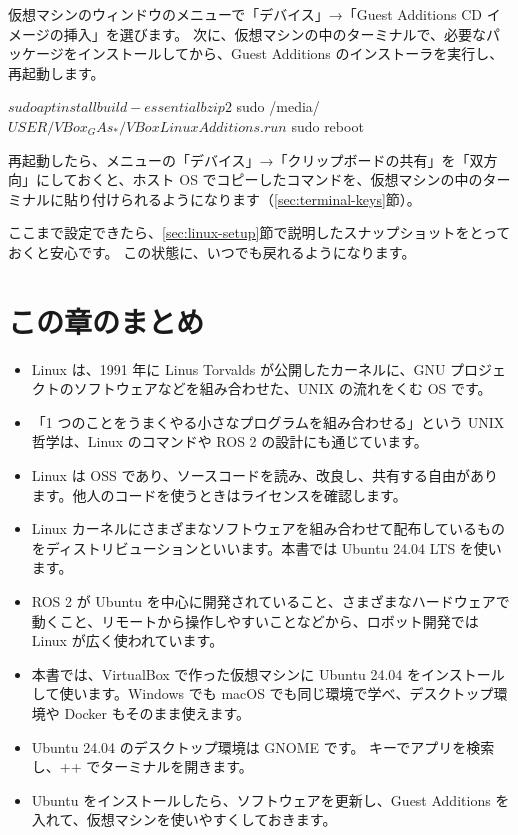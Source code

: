 仮想マシンのウィンドウのメニューで「デバイス」→「Guest Additions CD イメージの挿入」を選びます。
次に、仮想マシンの中のターミナルで、必要なパッケージをインストールしてから、Guest Additions のインストーラを実行し、再起動します。

\begin{terminal}
$ sudo apt install build-essential bzip2
$ sudo /media/$USER/VBox_GAs_*/VBoxLinuxAdditions.run
$ sudo reboot
\end{terminal}

再起動したら、メニューの「デバイス」→「クリップボードの共有」を「双方向」にしておくと、ホスト OS でコピーしたコマンドを、仮想マシンの中のターミナルに貼り付けられるようになります（\ref{sec:terminal-keys}節）。

ここまで設定できたら、\ref{sec:linux-setup}節で説明したスナップショットをとっておくと安心です。
この状態に、いつでも戻れるようになります。

\section*{この章のまとめ}

\begin{itemize}
  \item Linux は、1991 年に Linus Torvalds が公開したカーネルに、GNU プロジェクトのソフトウェアなどを組み合わせた、UNIX の流れをくむ OS です。
  \item 「1 つのことをうまくやる小さなプログラムを組み合わせる」という UNIX 哲学は、Linux のコマンドや ROS 2 の設計にも通じています。
  \item Linux は OSS であり、ソースコードを読み、改良し、共有する自由があります。他人のコードを使うときはライセンスを確認します。
  \item Linux カーネルにさまざまなソフトウェアを組み合わせて配布しているものをディストリビューションといいます。本書では Ubuntu 24.04 LTS を使います。
  \item ROS 2 が Ubuntu を中心に開発されていること、さまざまなハードウェアで動くこと、リモートから操作しやすいことなどから、ロボット開発では Linux が広く使われています。
  \item 本書では、VirtualBox で作った仮想マシンに Ubuntu 24.04 をインストールして使います。Windows でも macOS でも同じ環境で学べ、デスクトップ環境や Docker もそのまま使えます。
  \item Ubuntu 24.04 のデスクトップ環境は GNOME です。 キーでアプリを検索し、++ でターミナルを開きます。
  \item Ubuntu をインストールしたら、ソフトウェアを更新し、Guest Additions を入れて、仮想マシンを使いやすくしておきます。
\end{itemize}


